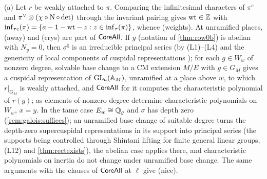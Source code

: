 \begin{proofoutline}
(a) Let $r$ be weakly attached to $\pi$. Comparing the infinitesimal characters of $\pi^c$ and
$\pi^\vee\otimes(\chi\circ\operatorname{N}\circ\det)$ through the invariant pairing gives $\mathrm{wt}\in\mathbb{Z}$ with
$\operatorname{inf}_{\tau c}(\pi)=\{a-1-\mathrm{wt}-z:z\in\operatorname{inf}_\tau(\pi)\}$, whence (weights). At unramified
places, (away) and (crys) are part of $\mathsf{CoreAll}$. If $y$ (notation of \cref{thm:row0b}) is
abelian with $N_y=0$, then
$\sigma^\natural$ is an irreducible principal series (by (L1)--(L4) and the genericity of local
components of cuspidal representations \cite{Shalika1974}); for each $g\in W_w$ of nonzero degree,
solvable base change \cite{ArthurClozel1989} to a CM extension $M/E$ with $g\in G_M$ gives a cuspidal
representation of $\operatorname{GL}_a(\mathbb{A}_M)$, unramified at a place above $w$, to which $r|_{G_M}$ is weakly
attached, and $\mathsf{CoreAll}$ for it computes the characteristic polynomial of $r(g)$; as elements of
nonzero degree determine characteristic polynomials on $W_w$, $x=y$. In the tame case $E_w\cong\mathbb{Q}_g$
and $\sigma$ has depth zero (\cref{rem:galois:suffices}); an unramified base change of suitable degree
turns the depth-zero supercuspidal representations in its support into principal series (the supports
being controlled through Shintani lifting for finite general linear groups, (L12) and
\cref{thm:rectexists}), the abelian case applies there, and characteristic polynomials on inertia do
not change under unramified base change. The same arguments with the clauses of $\mathsf{CoreAll}$ at
$\ell$ give (nice).


\end{proofoutline}
